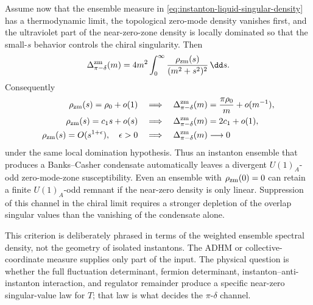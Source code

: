 \begin{controlledapproximation}
Assume now that the ensemble measure in
\eqref{eq:instanton-liquid-singular-density} has a thermodynamic limit, the
topological zero-mode density vanishes first, and the ultraviolet part of the
near-zero-zone density is locally dominated so that the small-\(s\) behavior
controls the chiral singularity.  Then
\begin{equation}
  \Delta_{\pi-\delta}^{\rm zm}(m)
  =
  4m^2\int_0^\infty
  \frac{\rho_{\rm zm}(s)}{(m^2+s^2)^2}\,\dd s .
  \label{eq:instanton-zero-mode-zone-u1a-kernel}
\end{equation}
Consequently
\begin{align}
  \rho_{\rm zm}(s)=\rho_0+o(1)
  &\quad\Longrightarrow\quad
  \Delta_{\pi-\delta}^{\rm zm}(m)
  =
  \frac{\pi\rho_0}{m}+o(m^{-1}), \\
  \rho_{\rm zm}(s)=c_1s+o(s)
  &\quad\Longrightarrow\quad
  \Delta_{\pi-\delta}^{\rm zm}(m)
  =
  2c_1+o(1), \\
  \rho_{\rm zm}(s)=O(s^{1+\epsilon}),\quad \epsilon>0
  &\quad\Longrightarrow\quad
  \Delta_{\pi-\delta}^{\rm zm}(m)\longrightarrow0
\end{align}
under the same local domination hypothesis.  Thus an instanton ensemble that
produces a Banks--Casher condensate automatically leaves a divergent
\(U(1)_A\)-odd zero-mode-zone susceptibility.  Even an ensemble with
\(\rho_{\rm zm}(0)=0\) can retain a finite \(U(1)_A\)-odd remnant if the
near-zero density is only linear.  Suppression of this channel in the chiral
limit requires a stronger depletion of the overlap singular values than the
vanishing of the condensate alone.

This criterion is deliberately phrased in terms of the weighted ensemble
spectral density, not the geometry of isolated instantons.  The ADHM or
collective-coordinate measure supplies only part of the input.  The physical
question is whether the full fluctuation determinant, fermion determinant,
instanton--anti-instanton interaction, and regulator remainder produce a
specific near-zero singular-value law for \(T\); that law is what decides the
\(\pi\)-\(\delta\) channel.
\end{controlledapproximation}


